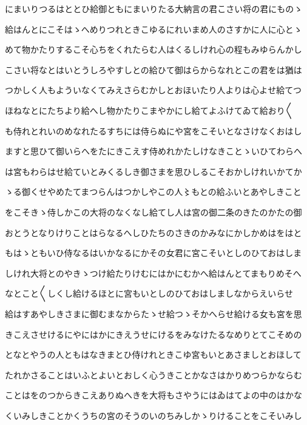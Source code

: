 \documentclass[a4paper,11pt,landscape]{ltjtarticle}
\begin{document}
\par\medskip
にまいりつるはととひ給御ともにまいりたる大納言の君こさい将の君にものゝ
\par\medskip
給はんとにこそはゝへめりつれときこゆるにれいまめ人のさすかに人に心とゝ
\par\medskip
めて物かたりするこそ心ちをくれたらむ人はくるしけれ心の程もみゆらんかし
\par\medskip
こさい将なとはいとうしろやすしとの給ひて御はらからなれとこの君をは猶は
\par\medskip
つかしく人もよういなくてみえさらむかしとおほいたり人よりは心よせ給てつ
\par\medskip
ほねなとにたちより給へし物かたりこまやかにし給てよふけてゐて給おり〱
\par\medskip
も侍れとれいのめなれたるすちには侍らぬにや宮をこそいとなさけなくおはし
\par\medskip
ますと思ひて御いらへをたにきこえす侍めれかたしけなきことゝいひてわらへ
\par\medskip
は宮もわらはせ給ていとみくるしき御さまを思ひしるこそおかしけれいかてか
\par\medskip
ゝる御くせやめたてまつらんはつかしやこの人〻もとの給ふいとあやしきこと
\par\medskip
をこそきゝ侍しかこの大将のなくなし給てし人は宮の御二条のきたのかたの御
\par\medskip
おとうとなりけりことはらなるへしひたちのさきのかみなにかしかめはをはと
\par\medskip
もはゝともいひ侍なるはいかなるにかその女君に宮こそいとしのひておはしま
\par\medskip
しけれ大将とのやきゝつけ給たりけむにはかにむかへ給はんとてまもりめそへ
\par\medskip
なとこと〱しくし給けるほとに宮もいとしのひておはしましなからえいらせ
\par\medskip
給はすあやしきさまに御むまなからたゝせ給つゝそかへらせ給ける女も宮を思
\par\medskip
きこえさせけるにやにはかにきえうせにけるをみなけたるなめりとてこそめの
\par\medskip
となとやうの人ともはなきまとひ侍けれときこゆ宮もいとあさましとおほして
\par\medskip
たれかさることはいふとよいとおしく心うきことかなさはかりめつらかならむ
\par\medskip
ことはをのつからきこえありぬへきを大将もさやうにはゐはてよの中のはかな
\par\medskip
くいみしきことかくうちの宮のそうのいのちみしかゝりけることをこそいみし
\end{document}
